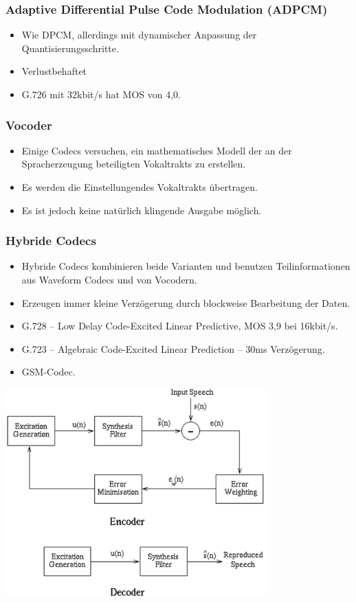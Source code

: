 \documentclass{article} %
\begin{document}
\subsubsection{Adaptive Differential Pulse Code Modulation (ADPCM)}
\begin{itemize}
	\item Wie DPCM, allerdings mit dynamischer Anpassung der Quantisierungsschritte.
	\item Verlustbehaftet
	\item G.726 mit 32kbit/s hat MOS von 4,0.
\end{itemize}
\subsubsection{Vocoder}
\begin{itemize}
	\item Einige Codecs versuchen, ein mathematisches Modell der an der Spracherzeugung beteiligten Vokaltrakts zu erstellen.
	\item Es werden die \glqq Einstellungen\grqq des Vokaltrakts übertragen.
	\item Es ist jedoch keine natürlich klingende Ausgabe möglich.
\end{itemize}
\subsubsection{Hybride Codecs}
\begin{itemize}
	\item Hybride Codecs kombinieren beide Varianten und benutzen Teilinformationen aus Waveform Codecs und von Vocodern.
	\item Erzeugen immer kleine Verzögerung durch blockweise Bearbeitung der Daten.
	\item G.728 – Low Delay Code-Excited Linear Predictive, MOS 3,9	bei 16kbit/s.
	\item G.723 – Algebraic Code-Excited Linear Prediction – 30ms Verzögerung.
	\item GSM-Codec.
\end{itemize}

\begin{center}
	\includegraphics[width=10cm]{img/hybridVoIP.png}
\end{center}
\end{document}
